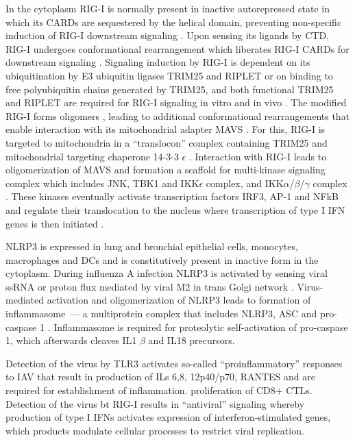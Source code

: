 		In the cytoplasm \gls{RIG-I} is normally present in inactive autorepressed state in which its \gls{CARD}s are sequestered by the helical domain, preventing non-specific induction of \gls{RIG-I} downstream signaling \parencite{Kowalinski2011}. Upon sensing its ligands by \gls{CTD}, \gls{RIG-I} undergoes conformational rearrangement which liberates \gls{RIG-I} \gls{CARD}s for downstream signaling \parencite{Kowalinski2011}. Signaling induction by \gls{RIG-I} is  dependent on its ubiquitination by E3 ubiquitin ligases TRIM25 and RIPLET or on binding to free polyubiquitin chains generated by TRIM25, and both functional TRIM25 and RIPLET are required for \gls{RIG-I} signaling in vitro and in vivo \parencite{Gack2007, Oshiumi2010, Zeng2010}. The modified \gls{RIG-I} forms oligomers \parencite{Patel2013}, leading to additional conformational rearrangements that enable interaction with its  mitochondrial adapter \gls{MAVS} \parencite{Kawai2005, Seth2005}. For this, \gls{RIG-I} is targeted to mitochondria in a ``translocon'' complex containing TRIM25 and mitochondrial targeting chaperone 14-3-3 $\epsilon$ \parencite{Liu2012}. Interaction with \gls{RIG-I} leads to oligomerization of \gls{MAVS} and formation a scaffold for multi-kinase signaling complex which includes \gls{JNK}, \gls{TBK1} and \gls{IKK}$\epsilon$ complex, and \gls{IKK}$\alpha$/$\beta$/$\gamma$ complex \parencite{McWhirter2005}. These kinases eventually activate transcription factors IRF3, AP-1 and \gls{NFkB} and regulate their translocation to the nucleus where transcription of type I \gls{IFN} genes is then initiated \parencite{McWhirter2005}. 
		
		\gls{NLRP3} is expressed in lung and bronchial epithelial cells, monocytes, macrophages and \gls{DC}s \parencite{Guarda2011, Kim2014} and is constitutively present in inactive form in the cytoplasm. During influenza A infection \gls{NLRP3} is activated by sensing viral \gls{ssRNA} or proton flux mediated by viral \gls{M2} in trans Golgi network \parencite{Thomas2009, Ichinohe2010, Allen2009}. Virus-mediated activation and oligomerization of \gls{NLRP3} leads to formation of inflammasome~--- a multiprotein complex that includes \gls{NLRP3}, \gls{ASC} and pro-caspase 1 \parencite{Tschopp2010}. Inflammasome is required for proteolytic self-activation of pro-caspase 1, which afterwards cleaves IL1 $\beta$ and IL18 precursors.
	
		Detection of the virus by TLR3 activates so-called ``proinflammatory'' responses\parencite{LeGoffic2007} to IAV that result in production of ILs 6,8, 12p40/p70, RANTES and are required for establishment of inflammation. proliferation of CD8+ CTLs. Detection of the virus bt RIG-I results in ``antiviral'' signaling \parencite{LeGoffic2007} whereby production of type I IFNs activates expression of interferon-stimulated genes, which products modulate cellular processes to restrict viral replication.
		

